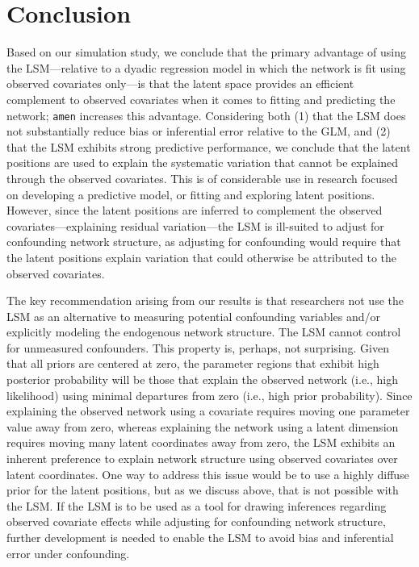 \documentclass[11pt]{article}
\begin{document}
\section{Conclusion}

Based on our simulation study, we conclude that the primary advantage of using the LSM---relative to a dyadic regression model in which the network is fit using observed covariates only---is that the latent space provides an efficient complement to observed covariates when it comes to fitting and predicting the network; \texttt{amen} increases this advantage.
Considering both (1) that the LSM does not substantially reduce bias or inferential error relative to the GLM, and (2) that the LSM exhibits strong predictive performance, we conclude that the latent positions are used to explain the systematic variation that cannot be explained through the observed covariates. This is of considerable use in research focused on developing a predictive model, or fitting and exploring latent positions. However, since the latent positions are inferred to complement the observed covariates---explaining residual variation---the LSM is ill-suited to adjust for confounding network structure, as adjusting for confounding would require that the latent positions explain variation that could otherwise be attributed to the observed covariates.

The key recommendation arising from our results is that researchers not use the LSM as an alternative to measuring potential confounding variables and/or explicitly modeling the endogenous network structure. The LSM cannot control for unmeasured confounders. This property is, perhaps, not surprising. Given that all priors are centered at zero, the parameter regions that exhibit high posterior probability will be those that explain the observed network (i.e., high likelihood) using minimal departures from zero (i.e., high prior probability). Since explaining the observed network using a covariate requires moving one parameter value away from zero, whereas explaining the network using a latent dimension requires moving many latent coordinates away from zero, the LSM exhibits an inherent preference to explain network structure using observed covariates over latent coordinates. One way to address this issue would be to use a highly diffuse prior for the latent positions, but as we discuss above, that is not possible with the LSM. If the LSM is to be used as a tool for drawing inferences regarding observed covariate effects while adjusting for confounding network structure, further development is needed to enable the LSM to avoid bias and inferential error under confounding.
\end{document}
